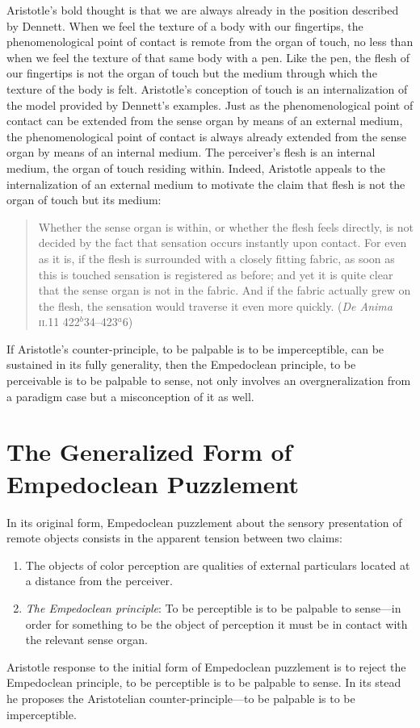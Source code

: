 Aristotle's bold thought is that we are always already in the position described by Dennett. When we feel the texture of a body with our fingertips, the phenomenological point of contact is remote from the organ of touch, no less than when we feel the texture of that same body with a pen. Like the pen, the flesh of our fingertips is not the organ of touch but the medium through which the texture of the body is felt. Aristotle's conception of touch is an internalization of the model provided by Dennett's examples. Just as the phenomenological point of contact can be extended from the sense organ by means of an external medium, the phenomenological point of contact is always already extended from the sense organ by means of an internal medium. The perceiver's flesh is an internal medium, the organ of touch residing within. Indeed, Aristotle appeals to the internalization of an external medium to motivate the claim that flesh is not the organ of touch but its medium:
\begin{quote}
    Whether the sense organ is within, or whether the flesh feels directly, is not decided by the fact that sensation occurs instantly upon contact. For even as it is, if the flesh is surrounded with a closely fitting fabric, as soon as this is touched sensation is registered as before; and yet it is quite clear that the sense organ is not in the fabric. And if the fabric actually grew on the flesh, the sensation would traverse it even more quickly. (\emph{De Anima} \textsc{ii}.11 422\( ^{b} \)34--423\( ^{a} \)6)
\end{quote}

If Aristotle's counter-principle, to be palpable is to be imperceptible, can be sustained in its fully generality, then the Empedoclean principle, to be perceivable is to be palpable to sense, not only involves an overgneralization from a paradigm case but a misconception of it as well. 


\section{The Generalized Form of Empedoclean Puzzlement} %
\label{sec:the_generalized_form_of_empedoclean_puzzlement}

In its original form, Empedoclean puzzlement about the sensory presentation of remote objects consists in the apparent tension between two claims:
\begin{enumerate}[(1)]
    \item The objects of color perception are qualities of external particulars located at a distance from the perceiver.
    \item \emph{The Empedoclean principle}: To be perceptible is to be palpable to sense---in order for something to be the object of perception it must be in contact with the relevant sense organ.
\end{enumerate}
Aristotle response to the initial form of Empedoclean puzzlement is to reject the Empedoclean principle, to be perceptible is to be palpable to sense. In its stead he proposes the Aristotelian counter-principle---to be palpable is to be imperceptible. 

